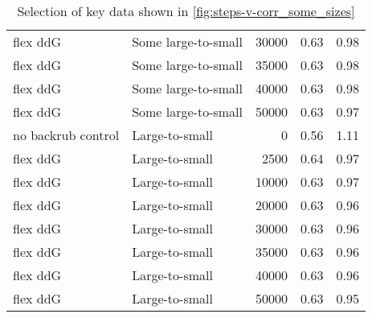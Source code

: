 \begin{table}
\begin{tabular}{llrrr}
           flex ddG &         Some large-to-small &         30000 & 0.63 & 0.98 \\
           flex ddG &         Some large-to-small &         35000 & 0.63 & 0.98 \\
           flex ddG &         Some large-to-small &         40000 & 0.63 & 0.98 \\
           flex ddG &         Some large-to-small &         50000 & 0.63 & 0.97 \\
 no backrub control &              Large-to-small &             0 & 0.56 & 1.11 \\
           flex ddG &              Large-to-small &          2500 & 0.64 & 0.97 \\
           flex ddG &              Large-to-small &         10000 & 0.63 & 0.97 \\
           flex ddG &              Large-to-small &         20000 & 0.63 & 0.96 \\
           flex ddG &              Large-to-small &         30000 & 0.63 & 0.96 \\
           flex ddG &              Large-to-small &         35000 & 0.63 & 0.96 \\
           flex ddG &              Large-to-small &         40000 & 0.63 & 0.96 \\
           flex ddG &              Large-to-small &         50000 & 0.63 & 0.95 \\
\bottomrule
\end{tabular}

\caption[]{Selection of key data shown in \cref{fig:steps-v-corr_some_sizes}}
\label{tab:steps-v-corr_some_sizes-underlying-data}
\end{table}
